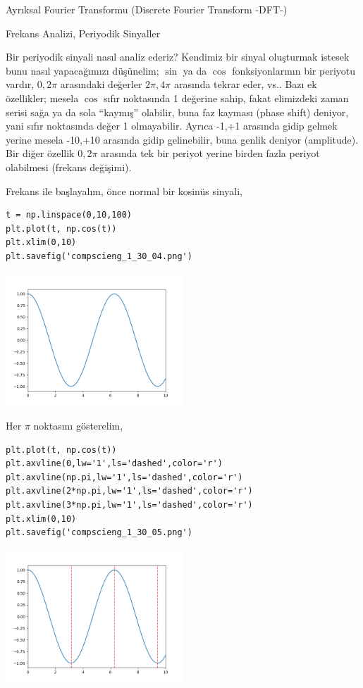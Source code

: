\documentclass[12pt,fleqn]{article}\usepackage{../../common}
\begin{document}
Ayrıksal Fourier Transformu (Discrete Fourier Transform -DFT-)

Frekans Analizi, Periyodik Sinyaller

Bir periyodik sinyali nasıl analiz ederiz? Kendimiz bir sinyal oluşturmak
istesek bunu nasıl yapacağımızı düşünelim; $\sin$ ya da $\cos$
fonksiyonlarının bir periyotu vardır, $0,2\pi$ arasındaki değerler
$2\pi,4\pi$ arasında tekrar eder, vs.. Bazı ek özellikler; mesela $\cos$
sıfır noktasında 1 değerine sahip, fakat elimizdeki zaman serisi sağa ya da
sola ``kaymış'' olabilir, buna faz kayması (phase shift) deniyor, yani
sıfır noktasında değer 1 olmayabilir. Ayrıca -1,+1 arasında gidip gelmek
yerine mesela -10,+10 arasında gidip gelinebilir, buna genlik deniyor
(amplitude). Bir diğer özellik $0,2\pi$ arasında tek bir periyot yerine
birden fazla periyot olabilmesi (frekans değişimi).

Frekans ile başlayalım, önce normal bir kosinüs sinyali,

\begin{verbatim}
t = np.linspace(0,10,100)
plt.plot(t, np.cos(t))
plt.xlim(0,10)
plt.savefig('compscieng_1_30_04.png')
\end{verbatim}

\includegraphics[height=5cm]{compscieng_1_30_04.png}

Her $\pi$ noktasını gösterelim,

\begin{verbatim}
plt.plot(t, np.cos(t))
plt.axvline(0,lw='1',ls='dashed',color='r')
plt.axvline(np.pi,lw='1',ls='dashed',color='r')
plt.axvline(2*np.pi,lw='1',ls='dashed',color='r')
plt.axvline(3*np.pi,lw='1',ls='dashed',color='r')
plt.xlim(0,10)
plt.savefig('compscieng_1_30_05.png')
\end{verbatim}

\includegraphics[height=5cm]{compscieng_1_30_05.png}
\end{document}
